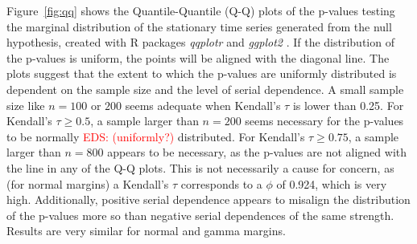 \documentclass[APA,Times1COL]{WileyNJDv5} %
\newcommand{\eds}[1]{\textcolor{red}{EDS: (#1)}}
\begin{document}
Figure~\ref{fig:qq} shows the Quantile-Quantile (Q-Q)
plots of the p-values testing the marginal distribution of the stationary time
series generated from the null hypothesis, created with R packages
\textsl{qqplotr} and \textsl{ggplot2} \citep{qqplotr, ggplot2}. If the
distribution of the p-values is uniform, the points will be aligned with the
diagonal line. The plots suggest that the extent to which the p-values are
uniformly distributed is dependent on the sample size and the level of serial 
dependence.
A small sample size like $n = 100$ or $200$ seems adequate when Kendall's
$\tau$ is lower than 0.25. For Kendall's $\tau \geq 0.5$, a sample larger than
$n = 200$ seems necessary for the p-values to be normally 
\eds{uniformly?} distributed. For
Kendall's $\tau \geq 0.75$, a sample larger than $n = 800$ appears to be 
necessary, as the p-values are not aligned with the line in any of the Q-Q 
plots. This
is not necessarily a cause for concern, as (for normal margins)
a Kendall's $\tau$ corresponds to
a $\phi$ of 0.924, which is very high.
Additionally, positive serial dependence appears to misalign the distribution
of the p-values more so than negative serial dependences of the same strength.
Results are very similar for normal and gamma margins.
\end{document}
